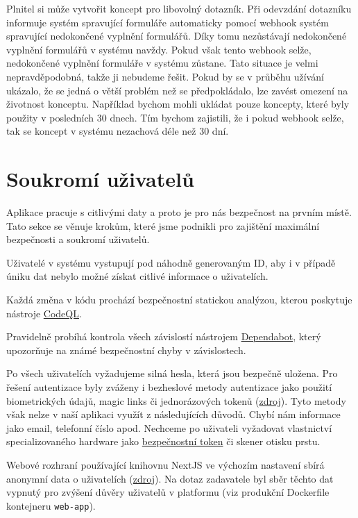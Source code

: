 Plnitel si může vytvořit koncept pro libovolný dotazník.
Při odevzdání dotazníku informuje systém spravující formuláře automaticky pomocí webhook systém spravující nedokončené vyplnění formulářů.
Díky tomu nezůstávají nedokončené vyplnění formulářů v systému navždy.
Pokud však tento webhook selže, nedokončené vyplnění formuláře v systému zůstane.
Tato situace je velmi nepravděpodobná, takže ji nebudeme řešit.
Pokud by se v průběhu užívání ukázalo, že se jedná o větší problém než se předpokládalo, lze zavést omezení na životnost konceptu.
Například bychom mohli ukládat pouze koncepty, které byly použity v posledních 30 dnech.
Tím bychom zajistili, že i pokud webhook selže, tak se koncept v systému nezachová déle než 30 dní.

\section{Soukromí uživatelů}\label{sec:soukromi-uzivatelu}

Aplikace pracuje s citlivými daty a proto je pro nás bezpečnost na prvním místě.
Tato sekce se věnuje krokům, které jsme podnikli pro zajištění maximální bezpečnosti a soukromí uživatelů.

Uživatelé v systému vystupují pod náhodně generovaným ID, aby i v případě úniku dat nebylo možné získat citlivé informace o uživatelích.

Každá změna v kódu prochází bezpečnostní statickou analýzou, kterou poskytuje nástroje \href{https://codeql.github.com/}{CodeQL}.

Pravidelně probíhá kontrola všech závislostí nástrojem \href{https://github.com/dependabot}{Dependabot}, který upozorňuje na známé bezpečnostní chyby v závislostech.

Po všech uživatelích vyžadujeme silná hesla, která jsou bezpečně uložena.
Pro řešení autentizace byly zváženy i bezheslové metody autentizace jako použití biometrických údajů, magic links či jednorázových tokenů (\href{https://auth0.com/blog/what-is-passwordless-authentication/}{zdroj}).
Tyto metody však nelze v naší aplikaci využít z následujících důvodů.
Chybí nám informace jako email, telefonní číslo apod.
Nechceme po uživateli vyžadovat vlastnictví specializovaného hardware jako \href{https://cs.wikipedia.org/wiki/Bezpe%C4%8Dnostn%C3%AD_token}{bezpečnostní token} či skener otisku prstu.

Webové rozhraní používající knihovnu NextJS ve výchozím nastavení sbírá anonymní data o uživatelích (\href{https://nextjs.org/telemetry}{zdroj}).
Na dotaz zadavatele byl sběr těchto dat vypnutý pro zvýšení důvěry uživatelů v platformu (viz produkční Dockerfile kontejneru \texttt{web-app}).

